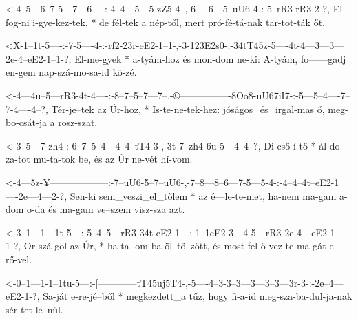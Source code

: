 

  {<-4--5---6--7-5---7---6----:-4--4---5---5-zZ5-4--,-6----6---5--uU6-4-:-5--rR3-rR3-2-?,}
  {  El-fog-ni i-gye-kez-tek, * de fél-tek a nép-től, mert pró-fé-tá-nak tar-tot-ták őt.}



  {<X-1--1t-5----:-7-5----4-:-rf2-23r-eE2-1--1-,-3-123E2s0-:-34tT45z-5----4t-4---3---3---2e-4--eE2-1--1-?,}
  {   El-me-gyek * a-tyám-hoz és  mon-dom ne-ki: A-tyám,     fo------gadj en-gem nap-szá-mo-sa-id  kö-zé.}




  {<-4---4u--5---rR3-4t-4----:-8--7--5--7---7--,-©----------------8Oo8-uU67iI7-:-5---5--4----7--7-4----4--?,}
  {  Tér-je--tek az  Úr-hoz, * Is-te-ne-tek-hez: jóságos_és_irgal-mas  ő,        meg-bo-csát-ja a rosz-szat.}

  {<-3--5---7-zh4-:-6--7--5--4---4--4--tT4-3-,-3t-7--zh4-6u-5---4--4--?,}
  {  Di-cső-í-tő  * ál-do-za-tot mu-ta-tok be, és az Úr  ne-vét hí-vom.}

  {<-4---5z-¥------------------:-7--uU6-5--7--uU6-,-7--8---8--6---7-5---5-4-:-4--4--4t--eE2-1----2e---4---2-?,}
  {  Sen-ki sem_veszi_el_tőlem * az é---le-te-met,  ha-nem ma-gam a-dom o-da  és ma-gam ve--szem visz-sza azt.}


  {<-3--1---1---1t-5---:-5--4--5---rR3-34t-eE2-1---:-1--1eE2-3---4-5---rR3-2e-4---eE2-1--1-?,}
  {  Or-szá-gol az Úr, * ha-ta-lom-ba  öl--tö--zött, és most fel-ö-vez-te  ma-gát e---rő-vel.}

  {<-0--1---1-1--1tu-5---:-[------------tT45uj5T4-,-5----4--3-3--3---3---3--3---3r-3-:-2e--4---eE2-1-?,}
  {  Sa-ját e-re-jé--ből * megkezdett_a tűz,        hogy fi-a-id meg-sza-ba-dul-ja-nak sér-tet-le--nül.}


